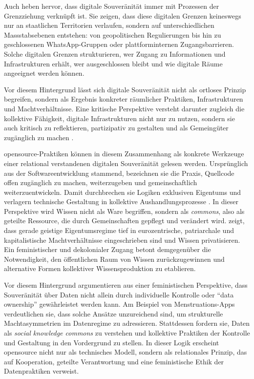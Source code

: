 Auch \textcite{zhangBordersBorderingSovereignty2023} heben hervor, dass digitale Souveränität immer mit Prozessen der Grenzziehung verknüpft ist. Sie zeigen, dass diese digitalen Grenzen keineswegs nur an staatlichen Territorien verlaufen, sondern auf unterschiedlichen Massstabsebenen entstehen: von geopolitischen Regulierungen bis hin zu geschlossenen WhatsApp-Gruppen oder plattforminternen Zugangsbarrieren. Solche digitalen Grenzen strukturieren, wer Zugang zu Informationen und Infrastrukturen erhält, wer ausgeschlossen bleibt und wie digitale Räume angeeignet werden können.

Vor diesem Hintergrund lässt sich digitale Souveränität nicht als ortloses Prinzip begreifen, sondern als Ergebnis konkreter räumlicher Praktiken, Infrastrukturen und Machtverhältnisse. Eine kritische Perspektive versteht darunter zugleich die kollektive Fähigkeit, digitale Infrastrukturen nicht nur zu nutzen, sondern sie auch kritisch zu reflektieren, partizipativ zu gestalten und als Gemeingüter zugänglich zu machen \parencite{baackDataficationEmpowermentHow2015}. 

\vspace{1em}

\gls{opensource}-Praktiken können in diesem Zusammenhang als konkrete Werkzeuge einer relational verstandenen digitalen Souveränität gelesen werden. Ursprünglich aus der Softwareentwicklung stammend, bezeichnen sie die Praxis, Quellcode offen zugänglich zu machen, weiterzugeben und gemeinschaftlich weiterzuentwickeln. Damit durchbrechen sie Logiken exklusiven Eigentums und verlagern technische Gestaltung in kollektive Aushandlungsprozesse \parencite{mathewFeministManifestoResistance2021}. In dieser Perspektive wird Wissen nicht als Ware begriffen, sondern als \emph{commons}, also als geteilte Ressource, die durch Gemeinschaften gepflegt und verändert wird. \textcite{mathewFeministManifestoResistance2021} zeigt, dass gerade geistige Eigentumsregime tief in eurozentrische, patriarchale und kapitalistische Machtverhältnisse eingeschrieben sind und Wissen privatisieren. Ein feministischer und dekolonialer Zugang betont demgegenüber die Notwendigkeit, den öffentlichen Raum von Wissen zurückzugewinnen und alternative Formen kollektiver Wissensproduktion zu etablieren.

Vor diesem Hintergrund argumentieren \textcite{gurumurthyDataBodiesNew2022} aus einer feministischen Perspektive, dass Souveränität über Daten nicht allein durch individuelle Kontrolle oder \enquote{data ownership} gewährleistet werden kann. Am Beispiel von Menstruations-Apps verdeutlichen sie, dass solche Ansätze unzureichend sind, um strukturelle Machtasymmetrien im Datenregime zu adressieren. Stattdessen fordern sie, Daten als \emph{social knowledge commons} zu verstehen und kollektive Praktiken der Kontrolle und Gestaltung in den Vordergrund zu stellen. In dieser Logik erscheint \gls{opensource} nicht nur als technisches Modell, sondern als relationales Prinzip, das auf Kooperation, geteilte Verantwortung und eine feministische Ethik der Datenpraktiken verweist.

